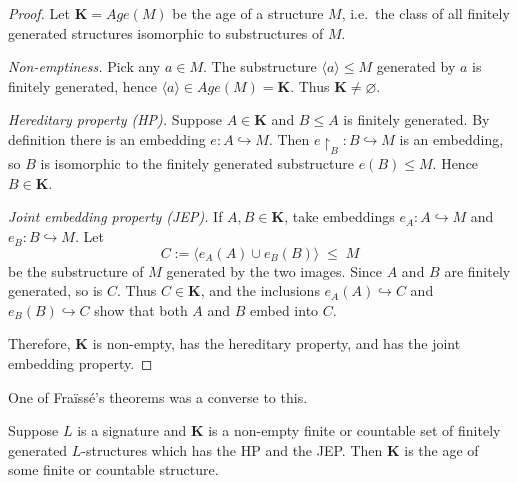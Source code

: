 \begin{proof}
    Let $\mathbf{K} = Age(M)$ be the age of a structure $M$, i.e.\ the class of all finitely generated structures isomorphic to substructures of $M$.


    \noindent\emph{Non-emptiness.}
    Pick any $a \in M$. The substructure $\langle a \rangle \leq M$ generated by $a$ is finitely generated, hence
    \(\langle a \rangle \in Age(M) = \mathbf{K}\). Thus $\mathbf{K} \neq \varnothing$.


    \noindent\emph{Hereditary property (HP).}
    Suppose $A \in \mathbf{K}$ and $B \leq A$ is finitely generated. By definition there is an embedding
    $e : A \hookrightarrow M$. Then $e\!\upharpoonright_B : B \hookrightarrow M$ is an embedding, so $B$ is isomorphic to the finitely generated substructure $e(B) \leq M$. Hence $B \in \mathbf{K}$.


    \noindent\emph{Joint embedding property (JEP).}
    If $A,B \in \mathbf{K}$, take embeddings $e_A : A \hookrightarrow M$ and $e_B : B \hookrightarrow M$. Let
    \[
        C := \langle e_A(A) \cup e_B(B) \rangle \;\leq\; M
    \]
    be the substructure of $M$ generated by the two images. Since $A$ and $B$ are finitely generated, so is $C$. Thus $C \in \mathbf{K}$, and the inclusions $e_A(A) \hookrightarrow C$ and $e_B(B) \hookrightarrow C$ show that both $A$ and $B$ embed into $C$.


    Therefore, $\mathbf{K}$ is non-empty, has the hereditary property, and has the joint embedding property.
\end{proof}

One of Fraïssé’s theorems was a converse to this.

\begin{theorem}
    Suppose \( L \) is a signature and \( \mathbf{K} \) is a non-empty finite or countable set of finitely generated \( L \)-structures which has the HP and the JEP. Then \( \mathbf{K} \) is the age of some finite or countable structure.
\end{theorem}


